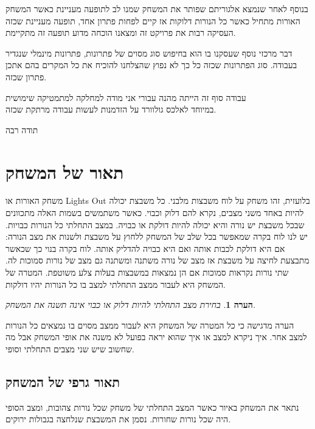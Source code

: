 \documentclass[12pt,leqno]{article}
\newtheorem{comm}{הערה}[section]
\begin{document}
בנוסף 
לאחר שנמצא אלגוריתם שפותר את המשחק שמנו לב לתופעה מעניינת  כאשר המשחק האורות
מתחיל כאשר כל הנורות דלוקות אז קיים לפחות פתרון אחד,
תופעה מעניינת שכזה העסיקה רבות את פרויקט זה ומצאנו הוכחה מדוע תופעה זה מתקיימת.

דבר מרכזי נוסף שעסקנו בו הוא בחיפוש סוג מסוים של פתרונות, פתרונות מינמלי שנגדיר בעבודה. 
סוג הפתרונות שכזה כל כך לא נפוץ שהצלחנו להוכיח את כל המקרים 
בהם אתכן פתרון שכזה.

עבודה סוף זה הייתה מהנה עבורי אני מודה למחלקה
למתמטיקה שימושית
\\
במיוחד לאלכס גולוורד על הזדמנות לעשות 
עבודה מרתקת שכזה.

תודה רבה

\newpage

\section{תאור של המשחק}
משחק האורות או 
\textenglish{Lights Out}
בלועזית,
זהו משחק על לוח משבצות מלבני.
כל משבצת יכולה להיות באחד משני מצבים, נקרא להם דלוק וכבוי.
כאשר משתמשים בשמות האלה מתכוונים שבכל משבצת יש נורה והיא יכולה להיות דולקת או כבויה. במצב התחלתי כל הנורות כבויות.
יש לנו לוח בקרה שמאפשר בכל שלב של המשחק ללחוץ על משבצת ולשנות את מצב הנורה: אם היא דולקת לכבות אותה ואם היא כבויה להדליק אותה.
לוח בקרה בנוי כך שכאשר מתבצעת לחיצה על משבצת אז מצב של נורה משתנה ומשתנה גם מצב של נורות סמוכות לה.
שתי נורות נקראות סמוכות אם הן נמצאות במשבצות בעלות צלע משוטפת.
המטרה של המשחק היא לעבור ממצב התחלתי למצב בו כל הנורות יהיו דולקות. 

\begin{comm}
    בחירת מצב התחלתי להיות דלוק או כבוי אינה תשנה את המשחק.
\end{comm}
הערה מדגישה כי כל המטרה של המשחק היא לעבור ממצב מסוים בו נמצאים כל הנורות למצב אחר.
איך ניקרא למצב או איך שהוא יראה בפועל לא משנה את אופי המשחק אבל מה שחשוב שיש שני מצבים התחלתי וסופי.

\subsection{תאור גרפי של המשחק}
נתאר את המשחק באיור כאשר
המצב התחלתי של משחק שכל נורות
צהובות, ומצב הסופי היה שכל נורות שחורות.
נסמן את המשבצת שנלחצה בגבולות ירוקים.
\end{document}
